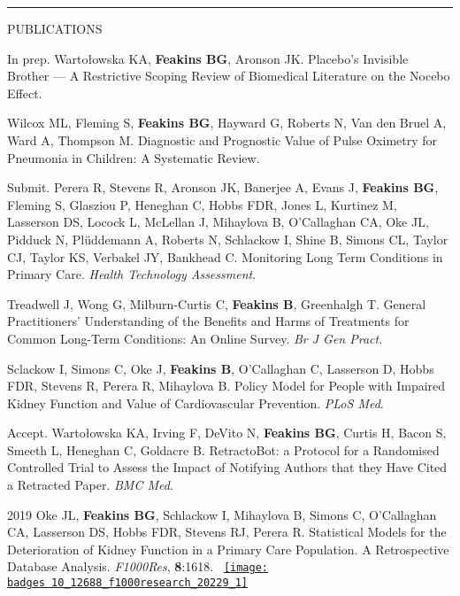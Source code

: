 \documentclass[10pt,a4paper]{article}
\def\badges{./badges/}
\begin{document}
\noindent\rule{\textwidth}{0.4pt}
\begin{cvlist}{PUBLICATIONS}
	
	\item[In prep.]
	Warto\l{}owska KA, \textbf{Feakins BG}, Aronson JK. Placebo’s Invisible Brother --- A Restrictive Scoping Review of Biomedical Literature on the Nocebo Effect.
	
	\item[]
	Wilcox ML, Fleming S, \textbf{Feakins BG}, Hayward G, Roberts N, Van den Bruel A, Ward A, Thompson M. Diagnostic and Prognostic Value of Pulse Oximetry for Pneumonia in Children: A Systematic Review.
	
	\item[Submit.]
	Perera R, Stevens R, Aronson JK, Banerjee A, Evans J, \textbf{Feakins BG}, Fleming S, Glasziou P, Heneghan C, Hobbs FDR, Jones L, Kurtinez M, Lasserson DS, Locock L, McLellan J, Mihaylova B, O'Callaghan CA, Oke JL, Pidduck N, Pl\"uddemann A, Roberts N, Schlackow I, Shine B, Simons CL, Taylor CJ, Taylor KS, Verbakel JY, Bankhead C. Monitoring Long Term Conditions in Primary Care. \textit{Health Technology Assessment}.
	
	\item[]
	Treadwell J, Wong G, Milburn-Curtis C, \textbf{Feakins B}, Greenhalgh T. General Practitioners' Understanding of the Benefits and Harms of Treatments for Common Long-Term Conditions: An Online Survey. \textit{Br J Gen Pract}.
	
	\item[]
	Sclackow I, Simons C, Oke J, \textbf{Feakins B}, O'Callaghan C, Lasserson D, Hobbs FDR, Stevens R, Perera R, Mihaylova B. Policy Model for People with Impaired Kidney Function and Value of Cardiovascular Prevention. \textit{PLoS Med}.
	
	\item[Accept.]
	Warto\l{}owska KA, Irving F, DeVito N, \textbf{Feakins BG}, Curtis H, Bacon S, Smeeth L, Heneghan C, Goldacre B. RetractoBot: a Protocol for a Randomised Controlled Trial to Assess the Impact of Notifying Authors that they Have Cited a Retracted Paper. \textit{BMC Med}. 
	
	\item[2019]
	Oke JL, \textbf{Feakins BG}, Schlackow I, Mihaylova B, Simons C, O'Callaghan CA, Lasserson DS, Hobbs FDR, Stevens RJ, Perera R. Statistical Models for the Deterioration of Kidney Function in a Primary Care Population. A Retrospective Database Analysis. \textit{F1000Res}, \textbf{8}:1618. ~\href{https://f1000research.altmetric.com/details/66389361}{\texttt{[image: \\badges 10\_12688\_f1000research\_20229\_1]}}
	

\end{cvlist}
\end{document}
